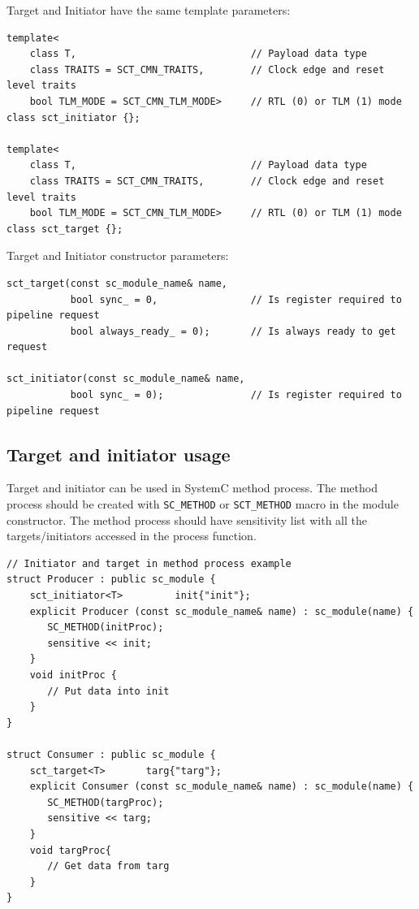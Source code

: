 Target and Initiator have the same template parameters:
\begin{lstlisting}[style=mycpp]
template<
    class T,                              // Payload data type 
    class TRAITS = SCT_CMN_TRAITS,        // Clock edge and reset level traits
    bool TLM_MODE = SCT_CMN_TLM_MODE>     // RTL (0) or TLM (1) mode
class sct_initiator {};

template<
    class T,                              // Payload data type 
    class TRAITS = SCT_CMN_TRAITS,        // Clock edge and reset level traits
    bool TLM_MODE = SCT_CMN_TLM_MODE>     // RTL (0) or TLM (1) mode
class sct_target {};
\end{lstlisting}

Target and Initiator constructor parameters:
\begin{lstlisting}[style=mycpp]
sct_target(const sc_module_name& name, 
           bool sync_ = 0,                // Is register required to pipeline request 
           bool always_ready_ = 0);       // Is always ready to get request

sct_initiator(const sc_module_name& name,
           bool sync_ = 0);               // Is register required to pipeline request  
\end{lstlisting}

\subsection{Target and initiator usage}\label{section:sct_targ_init_usage}

Target and initiator can be used in SystemC method process. The method process should be created with {\tt SC\_METHOD} or {\tt SCT\_METHOD}  macro in the module constructor. The method process should have sensitivity list with all the targets/initiators accessed in the process function.

\begin{lstlisting}[style=mycpp]
// Initiator and target in method process example
struct Producer : public sc_module {
    sct_initiator<T>         init{"init"};
    explicit Producer (const sc_module_name& name) : sc_module(name) {
       SC_METHOD(initProc); 
       sensitive << init;
    } 
    void initProc {
       // Put data into init
    }
}

struct Consumer : public sc_module {
    sct_target<T>       targ{"targ"};   
    explicit Consumer (const sc_module_name& name) : sc_module(name) {
       SC_METHOD(targProc); 
       sensitive << targ;
    } 
    void targProc{
       // Get data from targ
    }
}
\end{lstlisting}

